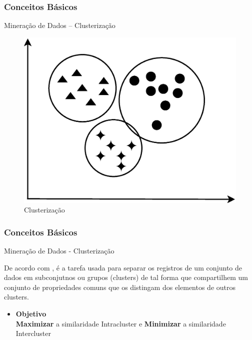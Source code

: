 \documentclass[hyperref={pdfpagelabels=false}]{beamer}
\begin{document}
\begin{frame}

	\frametitle{Conceitos Básicos}
    
    \Large{Mineração de Dados -- Clusterização}
    
    \begin{figure}
		\centering
	    \includegraphics[scale=0.3]{img/Clustering.eps}
        \caption{\scriptsize{Clusterização}}
	\end{figure}
    

\end{frame}

\begin{frame}

	\frametitle{Conceitos Básicos}
    
    \Large{Mineração de Dados - Clusterização}\linebreak
    \normalsize
   
    De acordo com \cite{goldschmidt2015data}, é a tarefa usada para separar os registros de um conjunto de dados em subconjutnos ou grupos (clusters) de tal forma que compartilhem um conjunto de propriedades comuns que os distingam dos elementos de outros clusters.
    \begin{itemize}
    \item \large{\textbf{Objetivo}} \\
    	\normalsize\textbf{Maximizar} a similaridade Intracluster e \textbf{Minimizar} a similaridade Intercluster
  		
    \end{itemize}
    

\end{frame}
\end{document}
